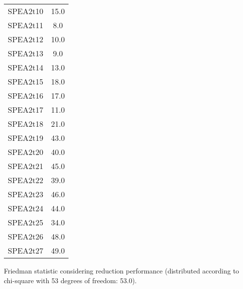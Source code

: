 \documentclass{article}
\begin{document}
\begin{table}[!htp]
\begin{tabular}{c|c}
SPEA2t10&15.0\\
SPEA2t11&8.0\\
SPEA2t12&10.0\\
SPEA2t13&9.0\\
SPEA2t14&13.0\\
SPEA2t15&18.0\\
SPEA2t16&17.0\\
SPEA2t17&11.0\\
SPEA2t18&21.0\\
SPEA2t19&43.0\\
SPEA2t20&40.0\\
SPEA2t21&45.0\\
SPEA2t22&39.0\\
SPEA2t23&46.0\\
SPEA2t24&44.0\\
SPEA2t25&34.0\\
SPEA2t26&48.0\\
SPEA2t27&49.0\\
\end{tabular}
\end{table}


Friedman statistic considering reduction performance (distributed according to chi-square with 53 degrees of freedom: 53.0).
\end{document}
